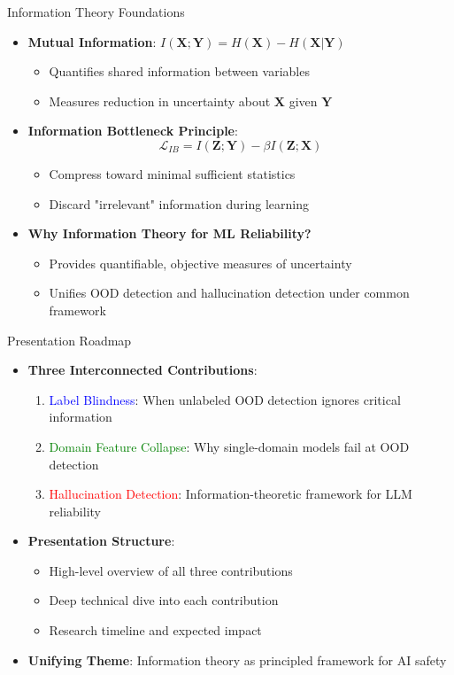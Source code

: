 \documentclass[aspectratio=169]{beamer}
\begin{document}
\begin{frame}{Information Theory Foundations}
\begin{itemize}
    \item \textbf{Mutual Information}: $I(\mathbf{X}; \mathbf{Y}) = H(\mathbf{X}) - H(\mathbf{X}|\mathbf{Y})$
    \begin{itemize}
        \item Quantifies shared information between variables
        \item Measures reduction in uncertainty about $\mathbf{X}$ given $\mathbf{Y}$
    \end{itemize}
    \item \textbf{Information Bottleneck Principle}:
    $$\mathcal{L}_{IB} = I(\mathbf{Z}; \mathbf{Y}) - \beta I(\mathbf{Z}; \mathbf{X})$$
    \begin{itemize}
        \item Compress toward minimal sufficient statistics
        \item Discard "irrelevant" information during learning
    \end{itemize}
    \item \textbf{Why Information Theory for ML Reliability?}
    \begin{itemize}
        \item Provides quantifiable, objective measures of uncertainty
        \item Unifies OOD detection and hallucination detection under common framework
    \end{itemize}
\end{itemize}
\end{frame}

\begin{frame}{Presentation Roadmap}
\begin{itemize}
    \item \textbf{Three Interconnected Contributions}:
    \begin{enumerate}
        \item \textcolor{blue}{Label Blindness}: When unlabeled OOD detection ignores critical information
        \item \textcolor{green}{Domain Feature Collapse}: Why single-domain models fail at OOD detection
        \item \textcolor{red}{Hallucination Detection}: Information-theoretic framework for LLM reliability
    \end{enumerate}
    \item \textbf{Presentation Structure}:
    \begin{itemize}
        \item High-level overview of all three contributions
        \item Deep technical dive into each contribution
        \item Research timeline and expected impact
    \end{itemize}
    \item \textbf{Unifying Theme}: Information theory as principled framework for AI safety
\end{itemize}
\end{frame}
\end{document}
